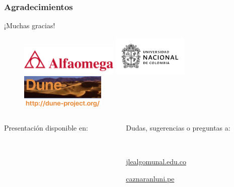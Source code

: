 \begin{frame}
	\frametitle{Agradecimientos}
	\begin{center}\LARGE
		¡Muchas gracias!
	\end{center}
	\begin{figure}[ht!]
		\centering
		\includegraphics[height=1.4cm]{alfaomega}\quad
		\includegraphics[height=1.9cm]{unal}\quad
		\includegraphics[height=1.6cm]{dune-logo}
	\end{figure}
	\vfill
	\begin{columns}
		\begin{column}{0.5\textwidth}
			\textcolor{c++reviewduneblue}{Presentación disponible en:}
			\begin{center}
				\href{}{\url{}}
			\end{center}
		\end{column}
		\hfill
		\begin{column}{0.5\textwidth}
			\begin{flushright}
				Dudas, sugerencias o preguntas a:

				\

				\href{mailto:jlealgom@unal.edu.co}{jlealgom\MVAt unal.edu.co}

				\href{mailto:caznaranl@uni.pe}{caznaranl\MVAt uni.pe}
			\end{flushright}
		\end{column}
	\end{columns}

\end{frame}